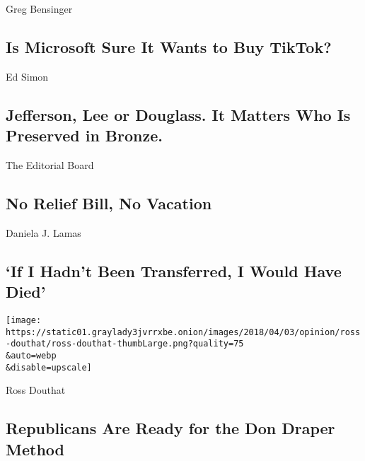 \href{/2020/08/04/opinion/tiktok-microsoft-trump.html}{}

Greg Bensinger

\hypertarget{is-microsoft-sure-it-wants-to-buy-tiktok}{%
\subsection{Is Microsoft Sure It Wants to Buy
TikTok?}\label{is-microsoft-sure-it-wants-to-buy-tiktok}}

\href{/2020/08/04/opinion/us-monuments-rome-unknown-god.html}{}

Ed Simon

\hypertarget{jefferson-lee-or-douglass-it-matters-who-is-preserved-in-bronze}{%
\subsection{Jefferson, Lee or Douglass. It Matters Who Is Preserved in
Bronze.}\label{jefferson-lee-or-douglass-it-matters-who-is-preserved-in-bronze}}

\href{/2020/08/04/opinion/coronavirus-relief-bill-senate-recess.html}{}

The Editorial Board

\hypertarget{no-relief-bill-no-vacation}{%
\subsection{No Relief Bill, No
Vacation}\label{no-relief-bill-no-vacation}}

\href{/2020/08/04/opinion/covid-rural-hospitals.html}{}

Daniela J. Lamas

\hypertarget{if-i-hadnt-been-transferred-i-would-have-died}{%
\subsection{`If I Hadn't Been Transferred, I Would Have
Died'}\label{if-i-hadnt-been-transferred-i-would-have-died}}

\href{/2020/08/04/opinion/trump-republicans-tea-party.html}{}

\texttt{[image: https://static01.graylady3jvrrxbe.onion/images/2018/04/03/opinion/ross-douthat/ross-douthat-thumbLarge.png?quality=75\\\&auto=webp\\\&disable=upscale]}

Ross Douthat

\hypertarget{republicans-are-ready-for-the-don-draper-method}{%
\subsection{Republicans Are Ready for the Don Draper
Method}\label{republicans-are-ready-for-the-don-draper-method}}

